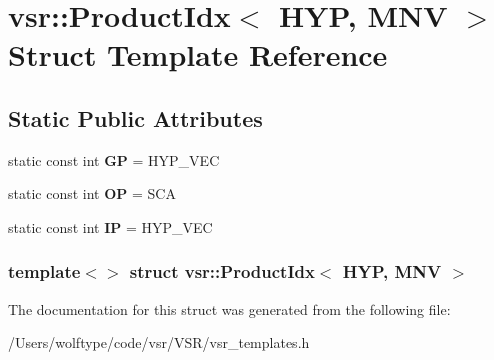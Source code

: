 \hypertarget{structvsr_1_1_product_idx_3_01_h_y_p_00_01_m_n_v_01_4}{\section{vsr\-:\-:Product\-Idx$<$ H\-Y\-P, M\-N\-V $>$ Struct Template Reference}
\label{structvsr_1_1_product_idx_3_01_h_y_p_00_01_m_n_v_01_4}
}
\subsection*{Static Public Attributes}
\begin{DoxyCompactItemize}
\item 
\hypertarget{structvsr_1_1_product_idx_3_01_h_y_p_00_01_m_n_v_01_4_ad41ecadceba3653f7496320967c4b776}{static const int {\bfseries G\-P} = H\-Y\-P\-\_\-\-V\-E\-C}\label{structvsr_1_1_product_idx_3_01_h_y_p_00_01_m_n_v_01_4_ad41ecadceba3653f7496320967c4b776}

\item 
\hypertarget{structvsr_1_1_product_idx_3_01_h_y_p_00_01_m_n_v_01_4_a09b7b043c6abe49d858179ae1d2a7484}{static const int {\bfseries O\-P} = S\-C\-A}\label{structvsr_1_1_product_idx_3_01_h_y_p_00_01_m_n_v_01_4_a09b7b043c6abe49d858179ae1d2a7484}

\item 
\hypertarget{structvsr_1_1_product_idx_3_01_h_y_p_00_01_m_n_v_01_4_a232bee13dbf284ea51a12a7aad64f7ca}{static const int {\bfseries I\-P} = H\-Y\-P\-\_\-\-V\-E\-C}\label{structvsr_1_1_product_idx_3_01_h_y_p_00_01_m_n_v_01_4_a232bee13dbf284ea51a12a7aad64f7ca}

\end{DoxyCompactItemize}
\subsubsection*{template$<$$>$ struct vsr\-::\-Product\-Idx$<$ H\-Y\-P, M\-N\-V $>$}



The documentation for this struct was generated from the following file\-:\begin{DoxyCompactItemize}
\item 
/\-Users/wolftype/code/vsr/\-V\-S\-R/vsr\-\_\-templates.\-h\end{DoxyCompactItemize}
